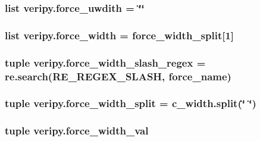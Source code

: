 \hypertarget{namespaceveripy_abb92d8c13117ba4c4421ceb0de1dc6b8}{
\subsubsection[{force\-\_\-uwdith}]{\setlength{\rightskip}{0pt plus 5cm}list veripy.\-force\-\_\-uwdith = \char`\"{}\char`\"{}}}\label{namespaceveripy_abb92d8c13117ba4c4421ceb0de1dc6b8}
\hypertarget{namespaceveripy_a16214fafff2c0c57bf66e31585f5d744}{
\subsubsection[{force\-\_\-width}]{\setlength{\rightskip}{0pt plus 5cm}list veripy.\-force\-\_\-width = {\bf force\-\_\-width\-\_\-split}\mbox{[}1\mbox{]}}}\label{namespaceveripy_a16214fafff2c0c57bf66e31585f5d744}
\hypertarget{namespaceveripy_a030728d416c89f9e49833da5a3a36e8f}{
\subsubsection[{force\-\_\-width\-\_\-slash\-\_\-regex}]{\setlength{\rightskip}{0pt plus 5cm}tuple veripy.\-force\-\_\-width\-\_\-slash\-\_\-regex = re.\-search(R\-E\-\_\-\-R\-E\-G\-E\-X\-\_\-\-S\-L\-A\-S\-H, {\bf force\-\_\-name})}}\label{namespaceveripy_a030728d416c89f9e49833da5a3a36e8f}
\hypertarget{namespaceveripy_a13b3bfca586edc9ccb7a76161973958d}{
\subsubsection[{force\-\_\-width\-\_\-split}]{\setlength{\rightskip}{0pt plus 5cm}tuple veripy.\-force\-\_\-width\-\_\-split = c\-\_\-width.\-split(\char`\"{} \char`\"{})}}\label{namespaceveripy_a13b3bfca586edc9ccb7a76161973958d}
\hypertarget{namespaceveripy_a60a97a619c71da8223604f1b12408d8f}{
\subsubsection[{force\-\_\-width\-\_\-val}]{\setlength{\rightskip}{0pt plus 5cm}tuple veripy.\-force\-\_\-width\-\_\-val}}\label{namespaceveripy_a60a97a619c71da8223604f1b12408d8f}
